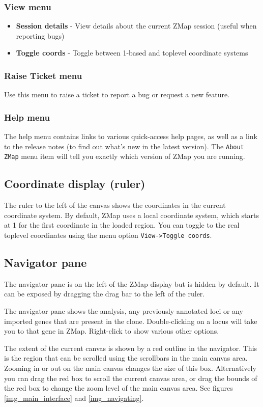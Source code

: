 \documentclass[letterpaper]{article}
\begin{document}
\subsubsection{View menu}
\begin{itemize}
\item \textbf{Session details} - View details about the current ZMap session (useful when reporting bugs)
\item \textbf{Toggle coords} - Toggle between 1-based and toplevel coordinate systems
\end{itemize}

\subsubsection{Raise Ticket menu}
Use this menu to raise a ticket to report a bug or request a new feature.

\subsubsection{Help menu}
The help menu contains links to various quick-access help pages, as well as a link to the release notes (to find out what's new in the latest version). The \lstinline{About ZMap} menu item will tell you exactly which version of ZMap you are running.


\subsection{Coordinate display (ruler)}
The ruler to the left of the canvas shows the coordinates in the current coordinate system. By default, ZMap uses a local coordinate system, which starts at 1 for the first coordinate in the loaded region. You can toggle to the real toplevel coordinates using the menu option \lstinline{View->Toggle coords}.


\subsection{Navigator pane}
The navigator pane is on the left of the ZMap display but is hidden by default. It can be exposed by dragging the drag bar to the left of the ruler.

The navigator pane shows the analysis, any previously annotated loci or any imported genes that are present in the clone. Double-clicking on a locus will take you to that gene in ZMap. Right-click to show various other options.

The extent of the current canvas is shown by a red outline in the navigator. This is the region that can be scrolled using the scrollbars in the main canvas area. Zooming in or out on the main canvas changes the size of this box. Alternatively you can drag the red box to scroll the current canvas area, or drag the bounds of the red box to change the zoom level of the main canvas area. See figures \ref{img_main_interface} and \ref{img_navigating}.
\end{document}
